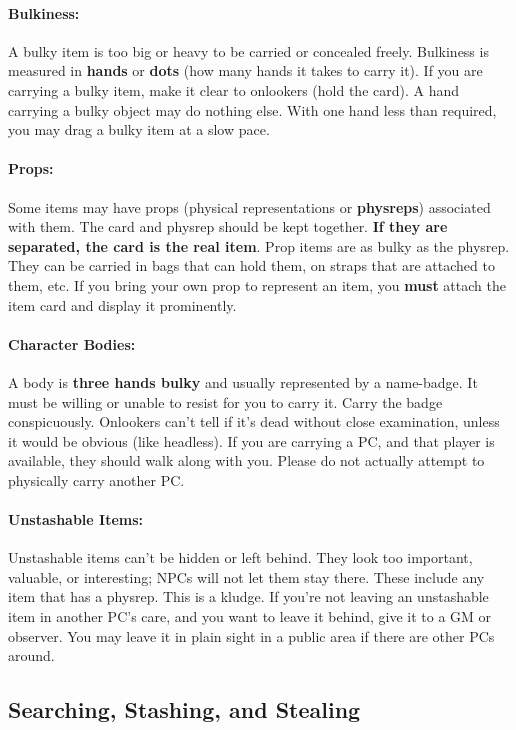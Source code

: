 \documentclass[sheet]{GL2020}
\begin{document}
\paragraph{Bulkiness:} A bulky item is too big or heavy to be carried or concealed freely.  Bulkiness is measured in {\bf hands} or {\bf dots} (how many hands it takes to carry it).  If you are carrying a bulky item, make it clear to onlookers (hold the card).  A hand carrying a bulky object may do nothing else.  With one hand less than required, you may drag a bulky item at a slow pace.

\paragraph{Props:} Some items may have props (physical representations or \textbf{physreps}) associated with them.  The card and physrep should be kept together.  \textbf{If they are separated, the card is the real item}. Prop items are as bulky as the physrep.  They can be carried in bags that can hold them, on straps that are attached to them, etc. If you bring your own prop to represent an item, you \textbf{must} attach the item card and display it prominently.

\paragraph{Character Bodies:} A body is {\bf three hands bulky} and usually represented by a name-badge.  It must be willing or unable to resist for you to carry it.  Carry the badge conspicuously.  Onlookers can't tell if it's dead without close examination, unless it would be
obvious (like headless). If you are carrying a PC, and that player is available, they should walk along with you. Please do not actually attempt to physically carry another PC.

\paragraph{Unstashable Items:} Unstashable items can't be hidden or left behind.  They look too important, valuable, or interesting; NPCs will not let them stay there.  These include any item that has a physrep. This is a kludge.  If you're not leaving an unstashable item in another PC's care, and you want to leave it behind, give it to a GM or observer.  You may leave it in plain sight in a public area if there are other PCs around.

\clearpage
\subsection{Searching, Stashing, and Stealing}
\end{document}

